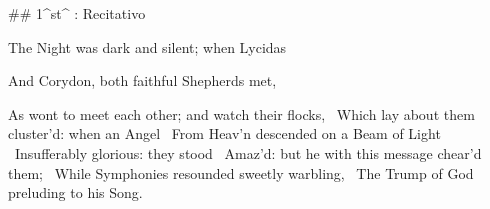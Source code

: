 ## 1^st^ \mvmt: Recitativo

\beginnumbering
\pstart
The Night was dark and silent; when Lycidas 

And Corydon, both faithful Shepherds met, 

As wont to meet each other; and watch their flocks, \
Which lay about them cluster’d: when an Angel \
From Heav’n descended on a Beam of Light \
Insufferably glorious: they stood \
Amaz’d: but he with this message chear’d them; \
While Symphonies resounded sweetly warbling, \
The Trump of God preluding to his Song.
\pend
\endnumbering
